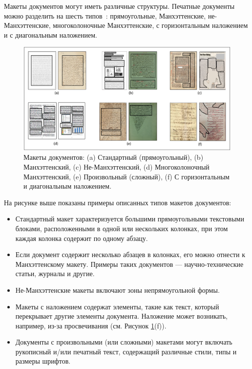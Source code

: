 
Макеты документов могут иметь различные структуры.
Печатные документы можно разделить на шесть типов~\cite{kise}: прямоугольные, Манхэттенские, не-Манхэттенские, многоколоночные Манхэттенские, с горизонтальным наложением и с диагональным наложением.

\begin{figure}[H]
	\centering
    \includegraphics[width=\textwidth]{img/layouts.png}
    \caption{Макеты документов: (a) Стандартный (прямоугольный), (b) Манхэттенский, (c) Не-Манхэттенский, (d) Многоколоночный Манхэттенский, (e) Произвольный (сложный), (f) С горизонтальным и диагональным наложением.~\cite{dla-survey}}
	\label{fig:layouts}
\end{figure}

На рисунке выше показаны примеры описанных типов макетов документов:
\begin{itemize}
    \item Стандартный макет характеризуется большими прямоугольными текстовыми блоками, расположенными в одной или нескольких колонках, при этом каждая колонка содержит по одному абзацу.
    \item Если документ содержит несколько абзацев в колонках, его можно отнести к Манхэттенскому макету.
Примеры таких документов --- научно-технические статьи, журналы и другие.
    \item Не-Манхэттенские макеты включают зоны непрямоугольной формы.
    \item Макеты с наложением содержат элементы, такие как текст, который перекрывает другие элементы документа.
Наложение может возникать, например, из-за просвечивания (см. Рисунок \ref{fig:layouts}(f)).
    \item Документы с произвольными (или сложными) макетами могут включать рукописный и/или печатный текст, содержащий различные стили, типы и размеры шрифтов.
\end{itemize}

